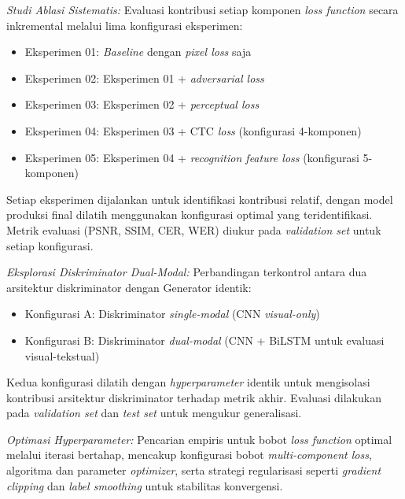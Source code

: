 \documentclass[12pt,a4paper]{book}
\begin{document}
\textit{Studi Ablasi Sistematis:} Evaluasi kontribusi setiap komponen \textit{loss function} secara inkremental melalui lima konfigurasi eksperimen:
\begin{itemize}[leftmargin=1.5cm, nosep]
\item Eksperimen 01: \textit{Baseline} dengan \textit{pixel loss} saja
\item Eksperimen 02: Eksperimen 01 + \textit{adversarial loss}
\item Eksperimen 03: Eksperimen 02 + \textit{perceptual loss}
\item Eksperimen 04: Eksperimen 03 + CTC \textit{loss} (konfigurasi 4-komponen)
\item Eksperimen 05: Eksperimen 04 + \textit{recognition feature loss} (konfigurasi 5-komponen)
\end{itemize}

Setiap eksperimen dijalankan untuk identifikasi kontribusi relatif, dengan model produksi final dilatih menggunakan konfigurasi optimal yang teridentifikasi. Metrik evaluasi (PSNR, SSIM, CER, WER) diukur pada \textit{validation set} untuk setiap konfigurasi.

\textit{Eksplorasi Diskriminator \textit{Dual-Modal}:} Perbandingan terkontrol antara dua arsitektur diskriminator dengan Generator identik:
\begin{itemize}[leftmargin=1.5cm, nosep]
\item Konfigurasi A: Diskriminator \textit{single-modal} (CNN \textit{visual-only})
\item Konfigurasi B: Diskriminator \textit{dual-modal} (CNN + BiLSTM untuk evaluasi visual-tekstual)
\end{itemize}

Kedua konfigurasi dilatih dengan \textit{hyperparameter} identik untuk mengisolasi kontribusi arsitektur diskriminator terhadap metrik akhir. Evaluasi dilakukan pada \textit{validation set} dan \textit{test set} untuk mengukur generalisasi.

\textit{Optimasi \textit{Hyperparameter}:} Pencarian empiris untuk bobot \textit{loss function} optimal melalui iterasi bertahap, mencakup konfigurasi bobot \textit{multi-component loss}, algoritma dan parameter \textit{optimizer}, serta strategi regularisasi seperti \textit{gradient clipping} dan \textit{label smoothing} untuk stabilitas konvergensi.

\end{document}
